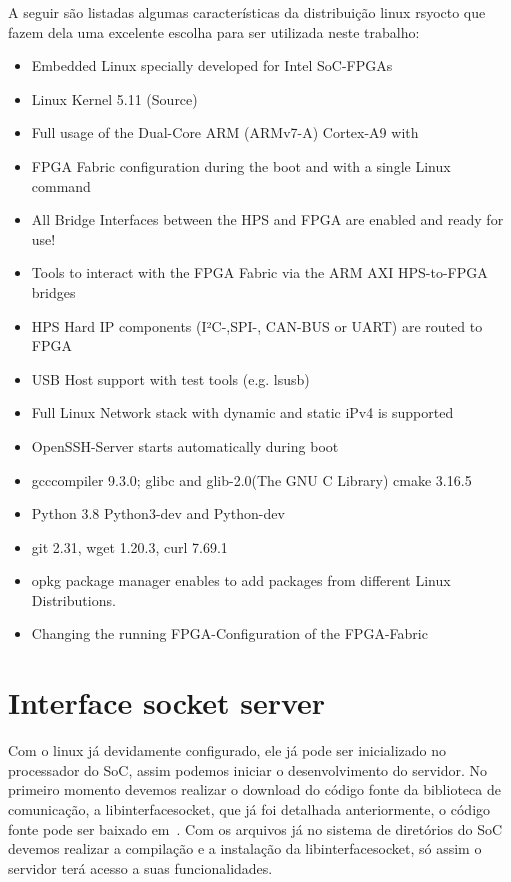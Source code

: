 A seguir são listadas algumas características da distribuição linux rsyocto que fazem dela uma excelente escolha para ser utilizada neste trabalho:
\begin{itemize}
	\item Embedded Linux specially developed for Intel SoC-FPGAs
	\item Linux Kernel 5.11 (Source)
	\item Full usage of the Dual-Core ARM (ARMv7-A) Cortex-A9 with
	\item FPGA Fabric configuration during the boot and with a single Linux command
	\item All Bridge Interfaces between the HPS and FPGA are enabled and ready for use!
	\item Tools to interact with the FPGA Fabric via the ARM AXI HPS-to-FPGA bridges
	\item HPS Hard IP components (I²C-,SPI-, CAN-BUS or UART) are routed to FPGA 
	\item USB Host support with test tools (e.g. lsusb)
	\item Full Linux Network stack with dynamic and static iPv4 is supported
	\item OpenSSH-Server starts automatically during boot
	\item gcccompiler 9.3.0; glibc and glib-2.0(The GNU C Library) cmake 3.16.5
	\item Python 3.8 Python3-dev and Python-dev
	\item git 2.31, wget 1.20.3, curl 7.69.1
	\item opkg package manager enables to add packages from different Linux Distributions.
	\item Changing the running FPGA-Configuration of the FPGA-Fabric
	\end{itemize}

\section{Interface socket server}
Com o linux já devidamente configurado, ele já pode ser inicializado no processador do SoC, assim podemos iniciar o desenvolvimento do servidor. No primeiro momento devemos realizar o download do código fonte da biblioteca de comunicação, a libinterfacesocket, que já foi detalhada anteriormente, o código fonte pode ser baixado em~\cite{interface-socket-server}. Com os arquivos já no sistema de diretórios do SoC devemos realizar a compilação e a instalação da libinterfacesocket, só assim o servidor terá acesso a suas funcionalidades. 

